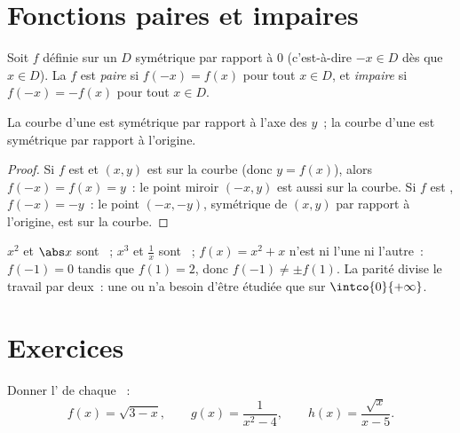 \section{Fonctions paires et impaires}

\begin{definition}[Parité]\label{def:g11:func:parity}
Soit $f$ définie sur un  $D$ symétrique par
rapport à $0$ (c'est-à-dire $-x \in D$ dès que $x \in D$). La 
$f$ est \emph{paire} si $f(-x) = f(x)$ pour tout
$x \in D$, et \emph{impaire} si
$f(-x) = -f(x)$ pour tout $x \in D$.
\end{definition}

\begin{proposition}\label{prop:g11:func:paritysym}
La courbe d'une  est symétrique par rapport à l'axe des
$y$~; la courbe d'une  est symétrique par rapport à
l'origine.
\end{proposition}

\begin{proof}
Si $f$ est  et $(x, y)$ est sur la courbe (donc $y = f(x)$), alors
$f(-x) = f(x) = y$~: le point miroir $(-x, y)$ est aussi sur la courbe.
Si $f$ est , $f(-x) = -y$~: le point $(-x, -y)$, symétrique de
$(x,y)$ par rapport à l'origine, est sur la courbe.
\end{proof}

\begin{example}
$x^2$ et $\abs x$ sont ~; $x^3$ et $\frac1x$ sont ~;
$f(x) = x^2 + x$ n'est ni l'une ni l'autre~: $f(-1) = 0$ tandis que
$f(1) = 2$, donc $f(-1) \neq \pm f(1)$. La parité divise le travail par
deux~: une  ou  n'a besoin d'être étudiée que sur
$\intco{0}{+\infty}$.
\end{example}

\section{Exercices}

\begin{exercise}[$\star$]\label{exo:g11:func:1}
Donner l' de chaque ~:
\[
f(x) = \sqrt{3 - x}, \qquad
g(x) = \frac{1}{x^2 - 4}, \qquad
h(x) = \frac{\sqrt{x}}{x - 5} .
\]
\end{exercise}

